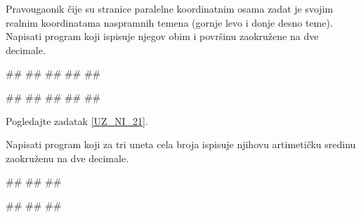 \begin{Exercise}[label=UZ_NI_25] 
Pravougaonik čije su stranice paralelne koordinatnim osama zadat je svojim realnim 
koordinatama naspramnih temena (gornje levo i donje desno teme). Napisati program koji 
ispisuje njegov obim i površinu zaokružene na dve decimale. 

\begin{maxitest}
\begin{upotreba}{1}
#\naslovInt#
##
##
##
##
\end{upotreba}
\end{maxitest}

\begin{maxitest}
\begin{upotreba}{2}
#\naslovInt#
##
##
##
##
\end{upotreba}
\end{maxitest}
\end{Exercise}
\ifresenja
\begin{Answer}[ref=UZ_NI_25]
Pogledajte zadatak \ref{UZ_NI_21}.
\end{Answer}
\fi



\begin{Exercise}[label=UZ_NI_26] 
Napisati program koji za tri uneta cela broja ispisuje njihovu artimetičku sredinu zaokruženu na dve decimale.

\begin{miditest}
\begin{upotreba}{1}
#\naslovInt#
##
##
\end{upotreba}
\end{miditest}
\begin{miditest}
\begin{upotreba}{2}
#\naslovInt#
##
##
\end{upotreba}
\end{miditest}

\end{Exercise}
\ifresenja
\begin{Answer}[ref=UZ_NI_26]
\end{Answer}
\fi


